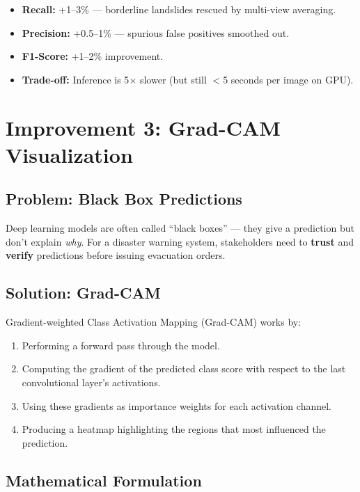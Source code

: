 \documentclass[11pt]{article}
\begin{document}
\begin{itemize}[noitemsep]
    \item \textbf{Recall:} +1--3\% --- borderline landslides rescued by multi-view averaging.
    \item \textbf{Precision:} +0.5--1\% --- spurious false positives smoothed out.
    \item \textbf{F1-Score:} +1--2\% improvement.
    \item \textbf{Trade-off:} Inference is 5$\times$ slower (but still $<$5 seconds per image on GPU).
\end{itemize}

\section{Improvement 3: Grad-CAM Visualization}

\subsection{Problem: Black Box Predictions}

Deep learning models are often called ``black boxes'' --- they give a prediction but don't explain \textit{why}.
For a disaster warning system, stakeholders need to \textbf{trust} and \textbf{verify} predictions before issuing evacuation orders.

\subsection{Solution: Grad-CAM}

Gradient-weighted Class Activation Mapping (Grad-CAM) works by:
\begin{enumerate}[noitemsep]
    \item Performing a forward pass through the model.
    \item Computing the gradient of the predicted class score with respect to the last convolutional layer's activations.
    \item Using these gradients as importance weights for each activation channel.
    \item Producing a heatmap highlighting the regions that most influenced the prediction.
\end{enumerate}

\subsection{Mathematical Formulation}
\end{document}
